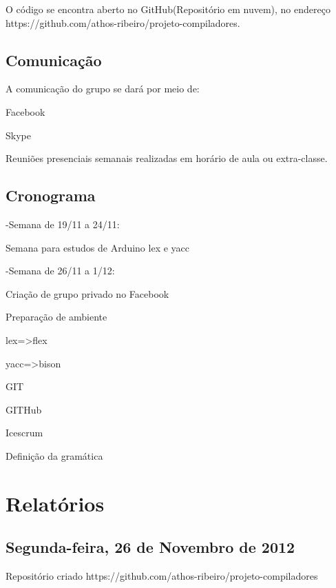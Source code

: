 \documentclass{abnt}
\begin{document}
O código se encontra aberto no GitHub(Repositório em nuvem), no endereço https://github.com/athos-ribeiro/projeto-compiladores.

\section{Comunicação}
    A comunicação do grupo se dará por meio de:

    Facebook

    Skype

    Reuniões presenciais semanais realizadas em horário de aula ou extra-classe.

\section{Cronograma}
    -Semana de 19/11 a 24/11:

         Semana para estudos de Arduino lex e yacc

    -Semana de 26/11 a 1/12:

         Criação de grupo privado no Facebook

         Preparação de ambiente

             lex=>flex

             yacc=>bison

             GIT

             GITHub

             Icescrum

         Definição da gramática

\chapter{Relatórios}
\section{Segunda-feira, 26 de Novembro de 2012}
Repositório criado
    https://github.com/athos-ribeiro/projeto-compiladores
\end{document}
